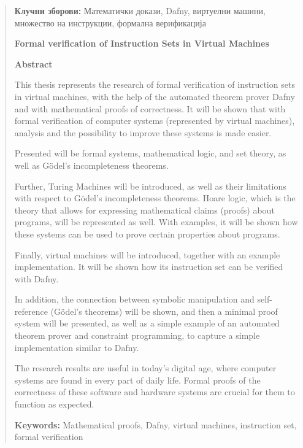 \begin{quote}
\vspace{0.14in}

\hspace*{10mm} \textbf{Клучни зборови:} Математички докази, Dafny, виртуелни машини, множество на инструкции, формална верификација

\newpage{}

\textbf{Formal verification of Instruction Sets in Virtual Machines}

\vspace{0.14in}

\textbf{Abstract}

\vspace{0.14in}

\hspace*{10mm} This thesis represents the research of formal verification of instruction sets in virtual machines, with the help of the automated theorem prover Dafny and with mathematical proofs of correctness. It will be shown that with formal verification of computer systems (represented by virtual machines), analysis and the possibility to improve these systems is made easier.

\hspace*{10mm} Presented will be formal systems, mathematical logic, and set theory, as well as Gödel's incompleteness theorems.

\hspace*{10mm} Further, Turing Machines will be introduced, as well as their limitations with respect to Gödel's incompleteness theorems. Hoare logic, which is the theory that allows for expressing mathematical claims (proofs) about programs, will be represented as well. With examples, it will be shown how these systems can be used to prove certain properties about programs.

\hspace*{10mm} Finally, virtual machines will be introduced, together with an example implementation. It will be shown how its instruction set can be verified with Dafny.

\hspace*{10mm} In addition, the connection between symbolic manipulation and self-reference (Gödel's theorems) will be shown, and then a minimal proof system will be presented, as well as a simple example of an automated theorem prover and constraint programming, to capture a simple implementation similar to Dafny.

\hspace*{10mm} The research results are useful in today's digital age, where computer systems are found in every part of daily life. Formal proofs of the correctness of these software and hardware systems are crucial for them to function as expected.

\vspace{0.14in}

\hspace*{10mm} \textbf{Keywords:} Mathematical proofs, Dafny, virtual machines, instruction set, formal verification
\end{quote}

\newpage{}

\setlength{\parskip}{0pt}
